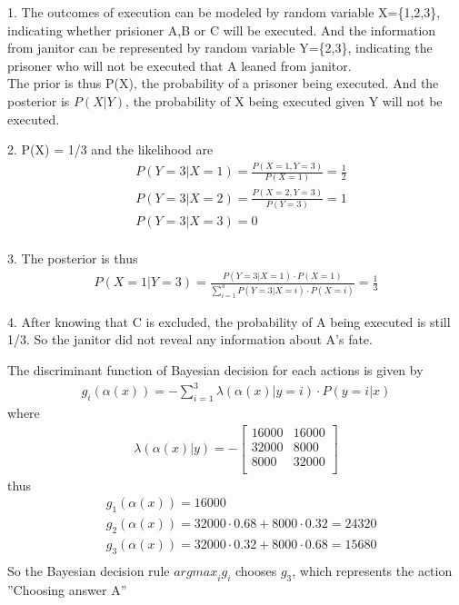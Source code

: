 \documentclass[12pt]{article}
\newenvironment{problem}[2][Problem]{\begin{trivlist}
\item[\hskip \labelsep {\bfseries #1}\hskip \labelsep {\bfseries #2}]}{\end{trivlist}}
\begin{document}
\begin{problem}{4. Reasoning with Bayesian rule}
\item{1.}
The outcomes of execution can be modeled by random variable X=\{1,2,3\}, indicating whether prisioner A,B or C will be executed. And the information from janitor can be represented by random variable Y=\{2,3\}, indicating the prisoner who will not be executed that A leaned from janitor.\\
The prior is thus P(X), the probability of a prisoner being executed. And the posterior is $P(X|Y)$, the probability of X being executed given Y will not be executed.
\item{2.}
	P(X) = 1/3 and the likelihood are
	\begin{align*}
	& P(Y=3|X=1) = \frac{P(X=1,Y=3)}{P(X=1)} = \frac{1}{2}\\
	& P(Y=3|X=2) = \frac{P(X=2,Y=3)}{P(Y=3)} = 1\\
	& P(Y=3|X=3) = 0\\
	\end{align*}
\item{3.} The posterior is thus
  \begin{align*}
	P(X=1|Y=3) = \frac{P(Y=3|X=1) \cdot P(X=1)}{\sum_{i=1}^{3}P(Y=3|X=i) \cdot P(X=i)} = \frac{1}{3}
  \end{align*}
\item{4.} After knowing that C is excluded, the probability of A being executed is still 1/3. So the janitor did not reveal any information about A's fate.
\end{problem}

\begin{problem}{5. Bayesian Decision}
\item The discriminant function of Bayesian decision for each actions is given by
  \begin{align*}
	g_i(\alpha(x)) = -\sum_{i=1}^{3}\lambda(\alpha (x)|y=i) \cdot P(y=i|x)
  \end{align*}
  where 
  \begin{align*}
	\lambda(\alpha(x)|y) = -
	  \begin{bmatrix}
		16000 & 16000 \\
		32000 & 8000 \\
		8000 & 32000 \\
	  \end{bmatrix}
  \end{align*}
  thus
  \begin{align*}
	& g_1(\alpha(x)) = 16000 \\
	& g_2(\alpha(x)) = 32000 \cdot 0.68 + 8000 \cdot 0.32 = 24320 \\
	& g_3(\alpha(x)) = 32000 \cdot 0.32 + 8000 \cdot 0.68 = 15680 \\
  \end{align*}
  So the Bayesian decision rule $\textit{argmax}_ig_i$ chooses $g_3$, which represents the action ''Choosing answer A''
\end{problem}

 
\end{document}

